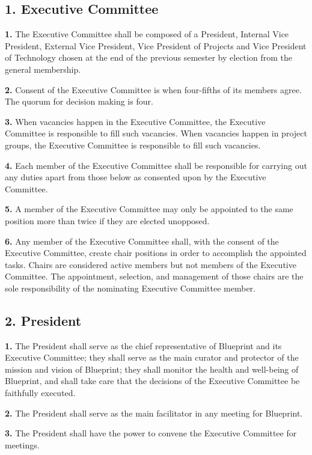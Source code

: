 \documentclass{article}
\begin{document}
\subsection{1. Executive Committee}
\textbf{1.} The Executive Committee shall be composed of a President, Internal Vice President, External Vice President, Vice President of Projects and Vice President of Technology chosen at the end of the previous semester by election from the general membership.

\textbf{2.} Consent of the Executive Committee is when four-fifths of its members agree. The quorum for decision making is four.

\textbf{3.} When vacancies happen in the Executive Committee, the Executive Committee is responsible to fill such vacancies. When vacancies happen in project groups, the Executive Committee is responsible to fill such vacancies.

\textbf{4.} Each member of the Executive Committee shall be responsible for carrying out any duties apart from those below as consented upon by the Executive Committee.

\textbf{5.} A member of the Executive Committee may only be appointed to the same position more than twice if they are elected unopposed.

\textbf{6.} Any member of the Executive Committee shall, with the consent of the Executive Committee, create chair positions in order to accomplish the appointed tasks. Chairs are considered active members but not members of the Executive Committee. The appointment, selection, and management of those chairs are the sole responsibility of the nominating Executive Committee member.

\subsection{2. President}

\textbf{1.} The President shall serve as the chief representative of Blueprint and its Executive Committee; they shall serve as the main curator and protector of the mission and vision of Blueprint; they shall monitor the health and well-being of Blueprint, and shall take care that the decisions of the Executive Committee be faithfully executed.

\textbf{2.} The President shall serve as the main facilitator in any meeting for Blueprint.

\textbf{3.} The President shall have the power to convene the Executive Committee for meetings.
\end{document}
